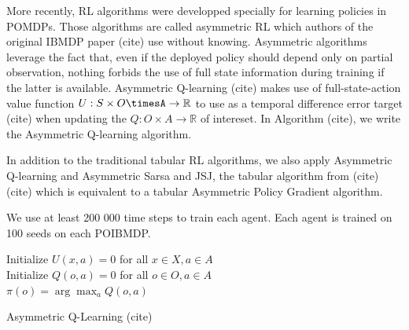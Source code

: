 More recently, RL algorithms were developped specially for learning policies in POMDPs. Those algorithms are called asymmetric RL which authors of the original IBMDP paper (cite) use without knowing. 
Asymmetric algorithms leverage the fact that, even if the deployed policy should depend only on partial observation, nothing forbids the use of full state information during training if the latter is available.
Asymmetric Q-learning (cite) makes use of full-state-action value function $U:S\times O \timesA \rightarrow \mathbb{R}$ to use as a temporal difference error target (cite) when updating the $Q:O\times A\rightarrow \mathbb{R}$ of intereset. 
In Algorithm (cite), we write the Asymmetric Q-learning algorithm.    

In addition to the traditional tabular RL algorithms, we also apply Asymmetric Q-learning and Asymmetric Sarsa and JSJ, the tabular algorithm from (cite)(cite) which is equivalent to a tabular Asymmetric Policy Gradient algorithm.

We use at least 200 000 time steps to train each agent. Each agent is trained on 100 seeds on each POIBMDP.  

\begin{algorithm}
    Initialize $U(x,a) = 0$ for all $x \in X, a \in A$ \\
    Initialize $Q(o,a) = 0$ for all $o \in O, a \in A$ \\

    $\pi(o) = \arg\max_a Q(o,a)$ 
    \caption{Asymmetric Q-Learning (cite)}\label{alg:asymqlearning}
\end{algorithm}

